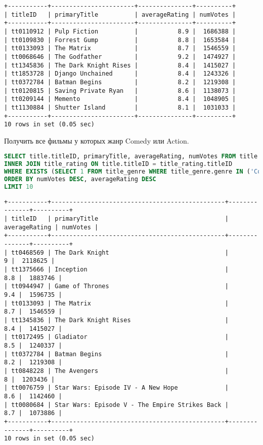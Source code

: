 \documentclass[12pt,a4paper]{article}
\begin{document}
\begin{lstlisting}[basicstyle = \tiny\ttfamily, columns = fixed]
+-----------+-----------------------+---------------+----------+
| titleID   | primaryTitle          | averageRating | numVotes |
+-----------+-----------------------+---------------+----------+
| tt0110912 | Pulp Fiction          |           8.9 |  1686388 |
| tt0109830 | Forrest Gump          |           8.8 |  1653584 |
| tt0133093 | The Matrix            |           8.7 |  1546559 |
| tt0068646 | The Godfather         |           9.2 |  1474927 |
| tt1345836 | The Dark Knight Rises |           8.4 |  1415027 |
| tt1853728 | Django Unchained      |           8.4 |  1243326 |
| tt0372784 | Batman Begins         |           8.2 |  1219308 |
| tt0120815 | Saving Private Ryan   |           8.6 |  1138073 |
| tt0209144 | Memento               |           8.4 |  1048905 |
| tt1130884 | Shutter Island        |           8.1 |  1031033 |
+-----------+-----------------------+---------------+----------+
10 rows in set (0.05 sec)
\end{lstlisting}

Получить все фильмы у которых жанр Comedy или Action.

\begin{lstlisting}[language=SQL]
SELECT title.titleID, primaryTitle, averageRating, numVotes FROM title
INNER JOIN title_rating ON title.titleID = title_rating.titleID
WHERE EXISTS (SELECT 1 FROM title_genre WHERE title_genre.genre IN ('Comedy', 'Action') AND title_genre.titleID = title.titleID)
ORDER BY numVotes DESC, averageRating DESC
LIMIT 10
\end{lstlisting}

\begin{lstlisting}[basicstyle = \tiny\ttfamily, columns = fixed]
+-----------+------------------------------------------------+---------------+----------+
| titleID   | primaryTitle                                   | averageRating | numVotes |
+-----------+------------------------------------------------+---------------+----------+
| tt0468569 | The Dark Knight                                |             9 |  2118625 |
| tt1375666 | Inception                                      |           8.8 |  1883746 |
| tt0944947 | Game of Thrones                                |           9.4 |  1596735 |
| tt0133093 | The Matrix                                     |           8.7 |  1546559 |
| tt1345836 | The Dark Knight Rises                          |           8.4 |  1415027 |
| tt0172495 | Gladiator                                      |           8.5 |  1240337 |
| tt0372784 | Batman Begins                                  |           8.2 |  1219308 |
| tt0848228 | The Avengers                                   |             8 |  1203436 |
| tt0076759 | Star Wars: Episode IV - A New Hope             |           8.6 |  1142460 |
| tt0080684 | Star Wars: Episode V - The Empire Strikes Back |           8.7 |  1073886 |
+-----------+------------------------------------------------+---------------+----------+
10 rows in set (0.05 sec)
\end{lstlisting}
\end{document}
